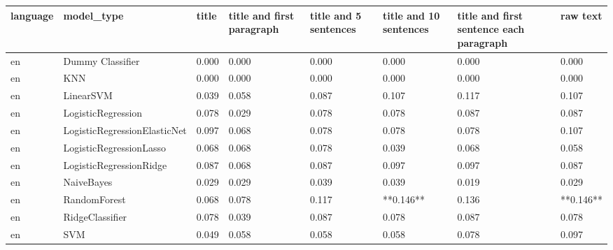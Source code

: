 \begin{tabular}{llllllll}
\toprule
language &                   model\_type & title & title and first paragraph & title and 5 sentences & title and 10 sentences & title and first sentence each paragraph &  raw text \\
\midrule
      en &             Dummy Classifier & 0.000 &                     0.000 &                 0.000 &                  0.000 &                                   0.000 &     0.000 \\
      en &                          KNN & 0.000 &                     0.000 &                 0.000 &                  0.000 &                                   0.000 &     0.000 \\
      en &                    LinearSVM & 0.039 &                     0.058 &                 0.087 &                  0.107 &                                   0.117 &     0.107 \\
      en &           LogisticRegression & 0.078 &                     0.029 &                 0.078 &                  0.078 &                                   0.087 &     0.087 \\
      en & LogisticRegressionElasticNet & 0.097 &                     0.068 &                 0.078 &                  0.078 &                                   0.078 &     0.107 \\
      en &      LogisticRegressionLasso & 0.068 &                     0.068 &                 0.078 &                  0.039 &                                   0.068 &     0.058 \\
      en &      LogisticRegressionRidge & 0.087 &                     0.068 &                 0.087 &                  0.097 &                                   0.097 &     0.087 \\
      en &                   NaiveBayes & 0.029 &                     0.029 &                 0.039 &                  0.039 &                                   0.019 &     0.029 \\
      en &                 RandomForest & 0.068 &                     0.078 &                 0.117 &              **0.146** &                                   0.136 & **0.146** \\
      en &              RidgeClassifier & 0.078 &                     0.039 &                 0.087 &                  0.078 &                                   0.087 &     0.078 \\
      en &                          SVM & 0.049 &                     0.058 &                 0.058 &                  0.058 &                                   0.078 &     0.097 \\

\end{tabular}
